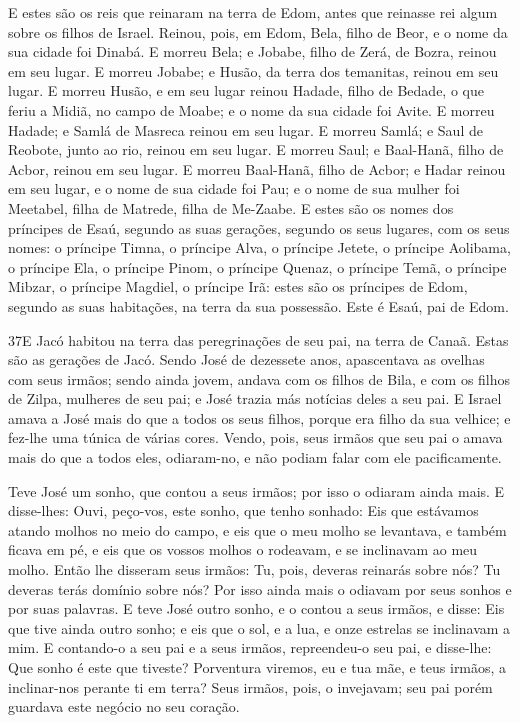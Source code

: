 E estes são os reis que reinaram na terra de Edom, antes que
reinasse rei algum sobre os filhos de Israel. Reinou, pois,
em Edom, Bela, filho de Beor, e o nome da sua cidade foi Dinabá.
E morreu Bela; e Jobabe, filho de Zerá, de Bozra, reinou em
seu lugar. E morreu Jobabe; e Husão, da terra dos temanitas,
reinou em seu lugar. E morreu Husão, e em seu lugar reinou
Hadade, filho de Bedade, o que feriu a Midiã, no campo de Moabe; e o
nome da sua cidade foi Avite. E morreu Hadade; e Samlá de
Masreca reinou em seu lugar. E morreu Samlá; e Saul de
Reobote, junto ao rio, reinou em seu lugar. E morreu Saul; e
Baal-Hanã, filho de Acbor, reinou em seu lugar. E morreu
Baal-Hanã, filho de Acbor; e Hadar reinou em seu lugar, e o nome de
sua cidade foi Pau; e o nome de sua mulher foi Meetabel, filha de
Matrede, filha de Me-Zaabe. E estes são os nomes dos
príncipes de Esaú, segundo as suas gerações, segundo os seus
lugares, com os seus nomes: o príncipe Timna, o príncipe Alva, o
príncipe Jetete, o príncipe Aolibama, o príncipe Ela, o
príncipe Pinom, o príncipe Quenaz, o príncipe Temã, o
príncipe Mibzar, o príncipe Magdiel, o príncipe Irã: estes
são os príncipes de Edom, segundo as suas habitações, na terra da
sua possessão. Este é Esaú, pai de Edom.

\smallskip

\lettrine{37} E Jacó habitou na terra das peregrinações de seu
pai, na terra de Canaã. Estas são as gerações de Jacó. Sendo
José de dezessete anos, apascentava as ovelhas com seus irmãos;
sendo ainda jovem, andava com os filhos de Bila, e com os filhos de
Zilpa, mulheres de seu pai; e José trazia más notícias deles a seu
pai. E Israel amava a José mais do que a todos os seus filhos,
porque era filho da sua velhice; e fez-lhe uma túnica de várias
cores. Vendo, pois, seus irmãos que seu pai o amava mais do que
a todos eles, odiaram-no, e não podiam falar com ele pacificamente.

Teve José um sonho, que contou a seus irmãos; por isso o odiaram
ainda mais. E disse-lhes: Ouvi, peço-vos, este sonho, que tenho
sonhado: Eis que estávamos atando molhos no meio do campo, e eis
que o meu molho se levantava, e também ficava em pé, e eis que os
vossos molhos o rodeavam, e se inclinavam ao meu molho. Então
lhe disseram seus irmãos: Tu, pois, deveras reinarás sobre nós? Tu
deveras terás domínio sobre nós? Por isso ainda mais o odiavam por
seus sonhos e por suas palavras. E teve José outro sonho, e o
contou a seus irmãos, e disse: Eis que tive ainda outro sonho; e eis
que o sol, e a lua, e onze estrelas se inclinavam a mim. E
contando-o a seu pai e a seus irmãos, repreendeu-o seu pai, e
disse-lhe: Que sonho é este que tiveste? Porventura viremos, eu e
tua mãe, e teus irmãos, a inclinar-nos perante ti em terra?
Seus irmãos, pois, o invejavam; seu pai porém guardava este
negócio no seu coração.

